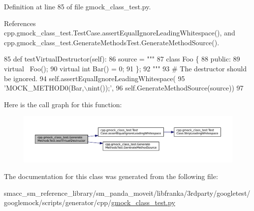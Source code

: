 Definition at line 85 of file gmock\+\_\+class\+\_\+test.\+py.



References cpp.\+gmock\+\_\+class\+\_\+test.\+Test\+Case.\+assert\+Equal\+Ignore\+Leading\+Whitespace(), and cpp.\+gmock\+\_\+class\+\_\+test.\+Generate\+Methods\+Test.\+Generate\+Method\+Source().


\begin{DoxyCode}
85   \textcolor{keyword}{def }testVirtualDestructor(self):
86     source = \textcolor{stringliteral}{"""}
87 \textcolor{stringliteral}{class Foo \{}
88 \textcolor{stringliteral}{ public:}
89 \textcolor{stringliteral}{  virtual ~Foo();}
90 \textcolor{stringliteral}{  virtual int Bar() = 0;}
91 \textcolor{stringliteral}{\};}
92 \textcolor{stringliteral}{"""}
93     \textcolor{comment}{# The destructor should be ignored.}
94     self.assertEqualIgnoreLeadingWhitespace(
95         \textcolor{stringliteral}{'MOCK\_METHOD0(Bar,\(\backslash\)nint());'},
96         self.GenerateMethodSource(source))
97 
\end{DoxyCode}
Here is the call graph for this function\+:
\nopagebreak
\begin{figure}[H]
\begin{center}
\leavevmode
\includegraphics[width=350pt]{classcpp_1_1gmock__class__test_1_1GenerateMethodsTest_a3095f7046a089b3c8a13e7e8161a2ab2_cgraph}
\end{center}
\end{figure}


The documentation for this class was generated from the following file\+:\begin{DoxyCompactItemize}
\item 
smacc\+\_\+sm\+\_\+reference\+\_\+library/sm\+\_\+panda\+\_\+moveit/libfranka/3rdparty/googletest/googlemock/scripts/generator/cpp/\hyperlink{gmock__class__test_8py}{gmock\+\_\+class\+\_\+test.\+py}\end{DoxyCompactItemize}
